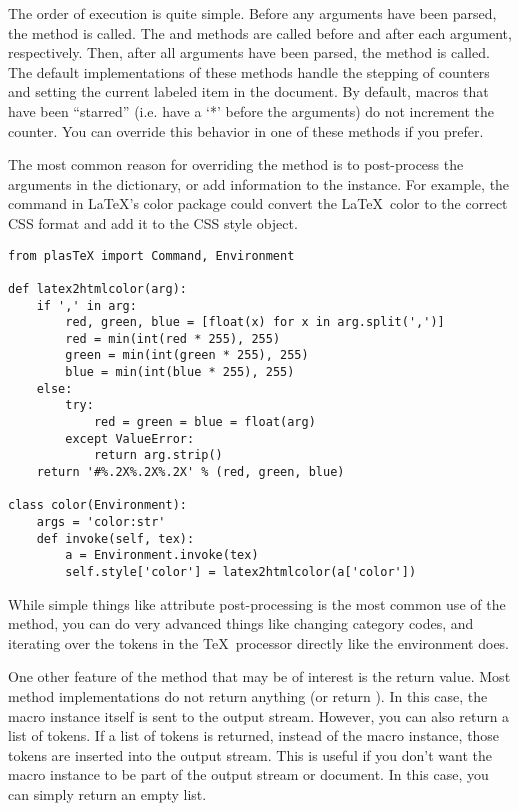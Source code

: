 The order of execution is quite simple.  Before any arguments have been
parsed, the  method is called.  The 
and  methods are called before and after each
argument, respectively.  Then, after all arguments have been parsed, the
 method is called.  The default implementations of
these methods handle the stepping of counters and setting the
current labeled item in the document.  By default, macros that have
been ``starred'' (i.e. have a `*' before the arguments) do not
increment the counter.  You can override this behavior in one of these
methods if you prefer.

The most common reason for overriding the  method is to
post-process the arguments in the  dictionary, or
add information to the instance.
For example, the  command in \LaTeX's color package
could convert the \LaTeX\ color to the correct CSS format
and add it to the CSS style object.
\begin{verbatim}
from plasTeX import Command, Environment

def latex2htmlcolor(arg):
    if ',' in arg:
        red, green, blue = [float(x) for x in arg.split(',')]
        red = min(int(red * 255), 255)
        green = min(int(green * 255), 255)
        blue = min(int(blue * 255), 255)
    else:
        try:
            red = green = blue = float(arg)
        except ValueError:
            return arg.strip()
    return '#%.2X%.2X%.2X' % (red, green, blue)

class color(Environment):
    args = 'color:str'
    def invoke(self, tex):
        a = Environment.invoke(tex)
        self.style['color'] = latex2htmlcolor(a['color'])
\end{verbatim}

While simple things like attribute post-processing is the most common
use of the  method, you can do very advanced things
like changing category codes, and iterating over the tokens in the
\TeX\ processor directly like the  environment
does.

One other feature of the  method that may be of interest
is the return value.  Most  method implementations do
not return anything (or return ).  In this case, the macro
instance itself is sent to the output stream.  However, you can also
return a list of tokens.  If a list of tokens is returned, instead of
the macro instance, those tokens are inserted into the output stream.
This is useful if you don't want the macro instance to be part of the
output stream or document.  In this case, you can simply return an
empty list.


